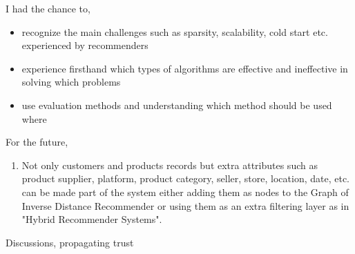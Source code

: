 I had the chance to,
\begin{itemize}
	\item recognize the main challenges such as sparsity, scalability, cold start etc. experienced by recommenders 
	\item experience firsthand which types of algorithms are effective and ineffective in solving which problems 
	\item use evaluation methods and understanding which method should be used where
\end{itemize}
For the future,
\begin{enumerate}
	\item Not only customers and products records but extra attributes such as product supplier, platform, product category, seller, store, location, date, etc. can be made part of the system either adding them as nodes to the Graph of Inverse Distance Recommender or using them as an extra filtering layer as in "Hybrid Recommender Systems".
\end{enumerate}
Discussions, propagating trust